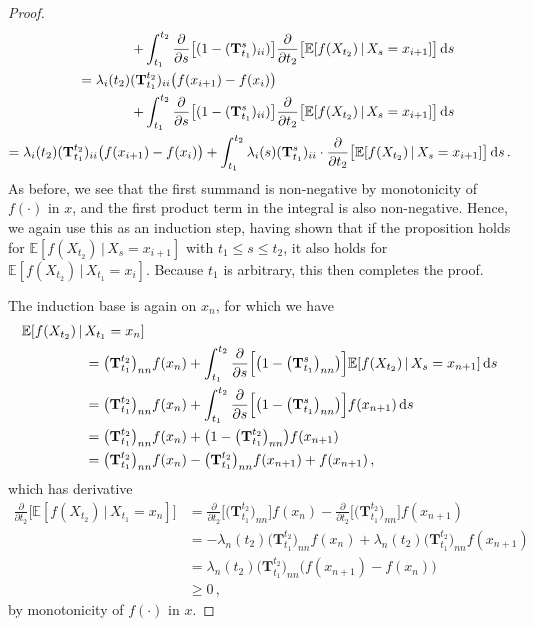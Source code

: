 \documentclass[10pt]{article}
\newcommand{\dx}[1][x]{\text{\,d}#1}
\begin{document}
\begin{proof}
\begin{align*}
+ \int_{t_1}^{t_2} \frac{\partial}{\partial s}\bigl[(1-(\mathbf{T}_{t_1}^s)_{ii})\bigr]&\frac{\partial}{\partial t_2}\bigl[\mathbb{E}[f(X_{t_2})\,\vert\,X_s=x_{i+1}]\bigr]\dx[s] \\
 = \lambda_i(t_2)(\mathbf{T}_{t_1}^{t_2})_{ii}\bigl(f(x_{i+1}) - f(x_i)\bigr)& \\
+ \int_{t_1}^{t_2} \frac{\partial}{\partial s}\bigl[(1-(\mathbf{T}_{t_1}^s)_{ii})\bigr]&\frac{\partial}{\partial t_2}\bigl[\mathbb{E}[f(X_{t_2})\,\vert\,X_s=x_{i+1}]\bigr]\dx[s] \\
 = \lambda_i(t_2)(\mathbf{T}_{t_1}^{t_2})_{ii}\bigl(f(x_{i+1}) - f(x_i)\bigr) + \int_{t_1}^{t_2} \lambda_i(s)&(\mathbf{T}_{t_1}^s)_{ii}\cdot\frac{\partial}{\partial t_2}\bigl[\mathbb{E}[f(X_{t_2})\,\vert\,X_s=x_{i+1}]\bigr]\dx[s]\,.
\end{align*}
As before, we see that the first summand is non-negative by monotonicity of $f(\cdot)$ in $x$, and the first product term in the integral is also non-negative. Hence, we again use this as an induction step, having shown that if the proposition holds for $\mathbb{E}[f(X_{t_2})\,\vert\,X_{s}=x_{i+1}]$ with $t_1\leq s\leq t_2$, it also holds for $\mathbb{E}[f(X_{t_2})\,\vert\,X_{t_1}=x_i]$. Because $t_1$ is arbitrary, this then completes the proof. 

The induction base is again on $x_n$, for which we have
\begin{align*}
\mathbb{E}[f(X_{t_2})\,\vert\,&X_{t_1}=x_n]  \\
 &= \bigl(\mathbf{T}_{t_1}^{t_2}\bigr)_{nn}f(x_n) + \int_{t_1}^{t_2} \frac{\partial}{\partial s}\Bigl[\bigl(1-\bigl(\mathbf{T}_{t_1}^s\bigr)_{nn}\bigr)\Bigr]\mathbb{E}[f(X_{t_2})\,\vert\,X_s=x_{n+1}]\dx[s] \\
 &= \bigl(\mathbf{T}_{t_1}^{t_2}\bigr)_{nn}f(x_n) + \int_{t_1}^{t_2} \frac{\partial}{\partial s}\Bigl[\bigl(1-\bigl(\mathbf{T}_{t_1}^s\bigr)_{nn}\bigr)\Bigr]f(x_{n+1})\dx[s] \\
 &= \bigl(\mathbf{T}_{t_1}^{t_2}\bigr)_{nn}f(x_n) + \bigl(1-\bigl(\mathbf{T}_{t_1}^{t_2}\bigr)_{nn}\bigr)f(x_{n+1}) \\
 &= \bigl(\mathbf{T}_{t_1}^{t_2}\bigr)_{nn}f(x_n) - \bigl(\mathbf{T}_{t_1}^{t_2}\bigr)_{nn}f(x_{n+1}) + f(x_{n+1})\,,
\end{align*}
which has derivative
\begin{align*}
\frac{\partial}{\partial t_2}\bigl[\mathbb{E}[f(X_{t_2})\,\vert\,X_{t_1}=x_n]\bigr] &= \frac{\partial}{\partial t_2}\bigl[\bigl(\mathbf{T}_{t_1}^{t_2}\bigr)_{nn}\bigr]f(x_n) - \frac{\partial}{\partial t_2}\bigl[\bigl(\mathbf{T}_{t_1}^{t_2}\bigr)_{nn}\bigr]f(x_{n+1}) \\
 &= -\lambda_n(t_2)\bigl(\mathbf{T}_{t_1}^{t_2}\bigr)_{nn}f(x_n) + \lambda_n(t_2)\bigl(\mathbf{T}_{t_1}^{t_2}\bigr)_{nn}f(x_{n+1}) \\
 &= \lambda_n(t_2)\bigl(\mathbf{T}_{t_1}^{t_2}\bigr)_{nn}\bigl(f(x_{n+1}) - f(x_n)\bigr) \\
 &\geq 0\,,
\end{align*}
by monotonicity of $f(\cdot)$ in $x$.
\end{proof}
\end{document}
